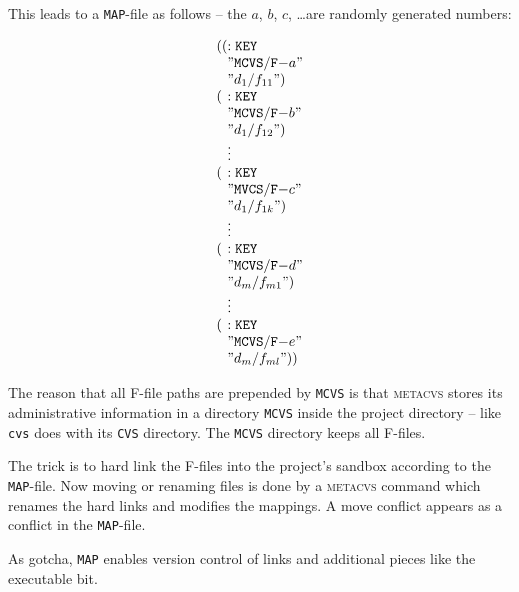 \documentclass[fleqn, 10pt, a4paper]{report} \usepackage{amssymb}
\begin{document}
\newpage

This leads to a \texttt{MAP}-file as follows -- the $a$, $b$, $c$,
\ldots are randomly generated numbers:

\begin{displaymath}
  \begin{array}{l@{}l}
    \mathtt{((} & \mathtt{:KEY} \\
    & \mathtt{"MCVS/F-}a \mathtt{"} \\
    & \mathtt{"}d_1/f_{11}\mathtt{")} \\
    \mathtt{(}  & \mathtt{:KEY} \\
    & \mathtt{"MCVS/F-}b \mathtt{"} \\
    & \mathtt{"}d_1/f_{12}\mathtt{")} \\
    & \vdots \\
    \mathtt{(}  & \mathtt{:KEY} \\
    & \mathtt{"MVCS/F-}c \mathtt{"} \\
    & \mathtt{"}d_1/f_{1k}\mathtt{")} \\
    & \vdots \\
    \mathtt{(}  & \mathtt{:KEY} \\
    & \mathtt{"MCVS/F-}d \mathtt{"} \\
    & \mathtt{"}d_m/f_{m1}\mathtt{")} \\
    & \vdots \\
    \mathtt{(}  & \mathtt{:KEY} \\
    & \mathtt{"MCVS/F-}e \mathtt{"} \\
    & \mathtt{"}d_m/f_{ml}\mathtt{"))} \\
  \end{array}
\end{displaymath}

The reason that all F-file paths are prepended by \texttt{MCVS} is
that \textsc{metacvs} stores its administrative information in a
directory \texttt{MCVS} inside the project directory -- like
\texttt{cvs} does with its \texttt{CVS} directory. The \texttt{MCVS}
directory keeps all F-files.

The trick is to hard link the F-files into the project's sandbox
according to the \texttt{MAP}-file. Now moving or renaming files is
done by a \textsc{metacvs} command which renames the hard links and
modifies the mappings. A move conflict appears as a conflict in the
\texttt{MAP}-file.

As gotcha, \texttt{MAP} enables version control of links and
additional pieces like the executable bit.
\end{document}
